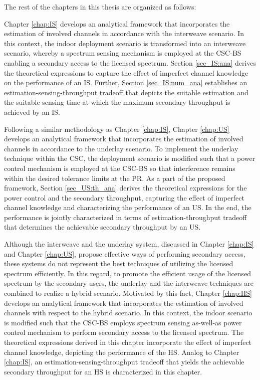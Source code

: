 The rest of the chapters in this thesis are organized as follows:

Chapter \ref{chap:IS} develops an analytical framework that incorporates the estimation of involved channels in accordance with the interweave scenario. In this context, the indoor deployment scenario is transformed into an interweave scenario, whereby a spectrum sensing mechanism is employed at the CSC-BS enabling a secondary access to the licensed spectrum. Section \ref{sec_IS:ana} derives the theoretical expressions to capture the effect of imperfect channel knowledge on the performance of an IS. Further, Section \ref{sec_IS:num_ana} establishes an estimation-sensing-throughput tradeoff that depicts the suitable estimation and the suitable sensing time at which the maximum secondary throughput is achieved by an IS. 


Following a similar methodology as Chapter \ref{chap:IS}, Chapter \ref{chap:US} develops an analytical framework that incorporates the estimation of involved channels in accordance to the underlay scenario. To implement the underlay technique within the CSC, the deployment scenario is modified such that a power control mechanism is employed at the CSC-BS so that interference remains within the desired tolerance limits at the PR. As a part of the proposed framework, Section \ref{sec_US:th_ana} derives the theoretical expressions for the power control and the secondary throughput, capturing the effect of imperfect channel knowledge and characterizing the performance of an US. In the end, the performance is jointly characterized in terms of estimation-throughput tradeoff that determines the achievable secondary throughput by an US.  

Although the interweave and the underlay system, discussed in Chapter \ref{chap:IS} and Chapter \ref{chap:US}, propose effective ways of performing secondary access, these systems do not represent the best techniques of utilizing the licensed spectrum efficiently. In this regard, to promote the efficient usage of the licensed spectrum by the secondary users, the underlay and the interweave techniques are combined to realize a hybrid scenario. Motivated by this fact, Chapter \ref{chap:HS} develops an analytical framework that incorporates the estimation of involved channels with respect to the hybrid scenario. In this context, the indoor scenario is modified such that the CSC-BS employs spectrum sensing as-well-as power control mechanism to perform secondary access to the licensed spectrum. The theoretical expressions derived in this chapter incorporate the effect of imperfect channel knowledge, depicting the performance of the HS. Analog to Chapter \ref{chap:IS}, an estimation-sensing-throughput tradeoff that yields the achievable secondary throughput for an HS is characterized in this chapter. 

